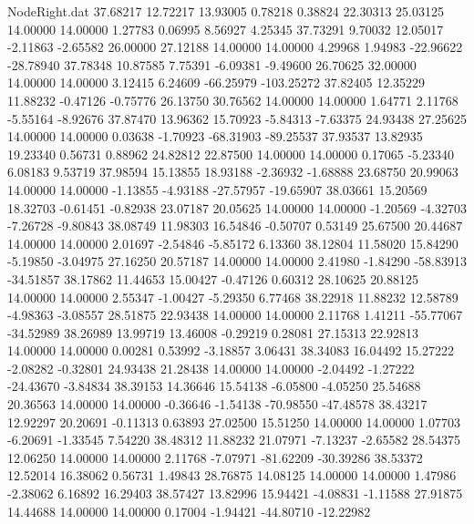 \begin{filecontents}{NodeRight.dat}
  37.68217   12.72217   13.93005     0.78218    0.38824   22.30313   25.03125   14.00000   14.00000    1.27783    0.06995    8.56927    4.25345
  37.73291    9.70032   12.05017    -2.11863   -2.65582   26.00000   27.12188   14.00000   14.00000    4.29968    1.94983  -22.96622  -28.78940
  37.78348   10.87585    7.75391    -6.09381   -9.49600   26.70625   32.00000   14.00000   14.00000    3.12415    6.24609  -66.25979 -103.25272
  37.82405   12.35229   11.88232    -0.47126   -0.75776   26.13750   30.76562   14.00000   14.00000    1.64771    2.11768   -5.55164   -8.92676
  37.87470   13.96362   15.70923    -5.84313   -7.63375   24.93438   27.25625   14.00000   14.00000    0.03638   -1.70923  -68.31903  -89.25537
  37.93537   13.82935   19.23340     0.56731    0.88962   24.82812   22.87500   14.00000   14.00000    0.17065   -5.23340    6.08183    9.53719
  37.98594   15.13855   18.93188    -2.36932   -1.68888   23.68750   20.99063   14.00000   14.00000   -1.13855   -4.93188  -27.57957  -19.65907
  38.03661   15.20569   18.32703    -0.61451   -0.82938   23.07187   20.05625   14.00000   14.00000   -1.20569   -4.32703   -7.26728   -9.80843
  38.08749   11.98303   16.54846    -0.50707    0.53149   25.67500   20.44687   14.00000   14.00000    2.01697   -2.54846   -5.85172    6.13360
  38.12804   11.58020   15.84290    -5.19850   -3.04975   27.16250   20.57187   14.00000   14.00000    2.41980   -1.84290  -58.83913  -34.51857
  38.17862   11.44653   15.00427    -0.47126    0.60312   28.10625   20.88125   14.00000   14.00000    2.55347   -1.00427   -5.29350    6.77468
  38.22918   11.88232   12.58789    -4.98363   -3.08557   28.51875   22.93438   14.00000   14.00000    2.11768    1.41211  -55.77067  -34.52989
  38.26989   13.99719   13.46008    -0.29219    0.28081   27.15313   22.92813   14.00000   14.00000    0.00281    0.53992   -3.18857    3.06431
  38.34083   16.04492   15.27222    -2.08282   -0.32801   24.93438   21.28438   14.00000   14.00000   -2.04492   -1.27222  -24.43670   -3.84834
  38.39153   14.36646   15.54138    -6.05800   -4.05250   25.54688   20.36563   14.00000   14.00000   -0.36646   -1.54138  -70.98550  -47.48578
  38.43217   12.92297   20.20691    -0.11313    0.63893   27.02500   15.51250   14.00000   14.00000    1.07703   -6.20691   -1.33545    7.54220
  38.48312   11.88232   21.07971    -7.13237   -2.65582   28.54375   12.06250   14.00000   14.00000    2.11768   -7.07971  -81.62209  -30.39286
  38.53372   12.52014   16.38062     0.56731    1.49843   28.76875   14.08125   14.00000   14.00000    1.47986   -2.38062    6.16892   16.29403
  38.57427   13.82996   15.94421    -4.08831   -1.11588   27.91875   14.44688   14.00000   14.00000    0.17004   -1.94421  -44.80710  -12.22982

\end{filecontents}

